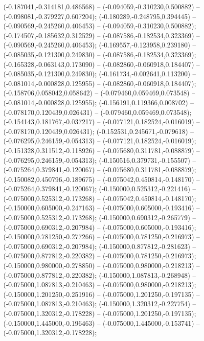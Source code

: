  (-0.187041,-0.314181,0.486568) -- (-0.094059,-0.310230,0.500882) -- (-0.098081,-0.379227,0.607204);
 (-0.180289,-0.248795,0.394445) -- (-0.090569,-0.245260,0.406453) -- (-0.094059,-0.310230,0.500882);
 (-0.174507,-0.185632,0.312529) -- (-0.087586,-0.182534,0.323369) -- (-0.090569,-0.245260,0.406453);
 (-0.169557,-0.123958,0.239180) -- (-0.085035,-0.121300,0.249830) -- (-0.087586,-0.182534,0.323369);
 (-0.165328,-0.063143,0.173090) -- (-0.082860,-0.060918,0.184407) -- (-0.085035,-0.121300,0.249830);
 (-0.161734,-0.002641,0.113200) -- (-0.081014,-0.000828,0.125955) -- (-0.082860,-0.060918,0.184407);
 (-0.158706,0.058042,0.058642) -- (-0.079460,0.059469,0.073548) -- (-0.081014,-0.000828,0.125955);
 (-0.156191,0.119366,0.008702) -- (-0.078170,0.120439,0.026431) -- (-0.079460,0.059469,0.073548);
 (-0.154143,0.181767,-0.037217) -- (-0.077121,0.182524,-0.016019) -- (-0.078170,0.120439,0.026431);
 (-0.152531,0.245671,-0.079618) -- (-0.076295,0.246159,-0.054313) -- (-0.077121,0.182524,-0.016019);
 (-0.151328,0.311512,-0.118926) -- (-0.075680,0.311781,-0.088879) -- (-0.076295,0.246159,-0.054313);
 (-0.150516,0.379731,-0.155507) -- (-0.075264,0.379841,-0.120067) -- (-0.075680,0.311781,-0.088879);
 (-0.150082,0.450796,-0.189675) -- (-0.075042,0.450814,-0.148170) -- (-0.075264,0.379841,-0.120067);
 (-0.150000,0.525312,-0.221416) -- (-0.075000,0.525312,-0.173268) -- (-0.075042,0.450814,-0.148170);
 (-0.150000,0.605000,-0.247163) -- (-0.075000,0.605000,-0.193416) -- (-0.075000,0.525312,-0.173268);
 (-0.150000,0.690312,-0.265779) -- (-0.075000,0.690312,-0.207984) -- (-0.075000,0.605000,-0.193416);
 (-0.150000,0.781250,-0.277266) -- (-0.075000,0.781250,-0.216973) -- (-0.075000,0.690312,-0.207984);
 (-0.150000,0.877812,-0.281623) -- (-0.075000,0.877812,-0.220382) -- (-0.075000,0.781250,-0.216973);
 (-0.150000,0.980000,-0.278850) -- (-0.075000,0.980000,-0.218213) -- (-0.075000,0.877812,-0.220382);
 (-0.150000,1.087813,-0.268948) -- (-0.075000,1.087813,-0.210463) -- (-0.075000,0.980000,-0.218213);
 (-0.150000,1.201250,-0.251916) -- (-0.075000,1.201250,-0.197135) -- (-0.075000,1.087813,-0.210463);
 (-0.150000,1.320312,-0.227754) -- (-0.075000,1.320312,-0.178228) -- (-0.075000,1.201250,-0.197135);
 (-0.150000,1.445000,-0.196463) -- (-0.075000,1.445000,-0.153741) -- (-0.075000,1.320312,-0.178228);
